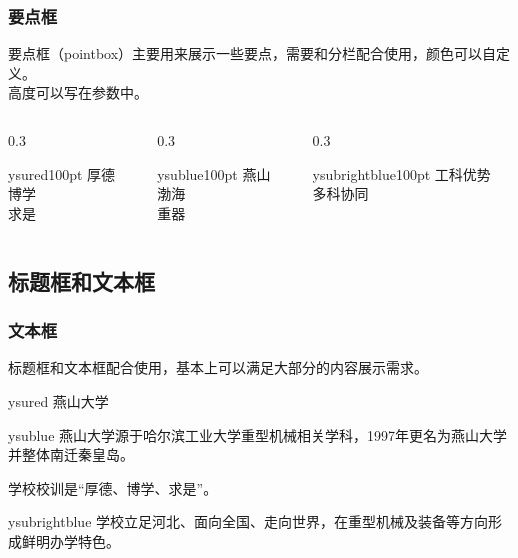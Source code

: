 \documentclass[aspectratio=169,UTF8,t]{beamer}%
\begin{document}
\begin{frame}
    \frametitle{要点框}
    要点框（pointbox）主要用来展示一些要点，需要和分栏配合使用，颜色可以自定义。 \\   
    高度可以写在参数中。  
      \begin{columns}[T,onlytextwidth]
        \begin{column}{0.3\textwidth}
            \begin{pointbox}[要点一]{ysured}{100pt}
                厚德\\
                博学\\
                求是\\
            \end{pointbox}
        \end{column}
        \begin{column}{0.3\textwidth}
            \begin{pointbox}[要点二]{ysublue}{100pt}
                燕山\\
                渤海\\
                重器 
            \end{pointbox}            
        \end{column}
        \begin{column}{0.3\textwidth}
            \begin{pointbox}[要点三]{ysubrightblue}{100pt}
                工科优势\\
                多科协同 
            \end{pointbox}
        \end{column}
    \end{columns}    
\end{frame}

\subsection{标题框和文本框}

\begin{frame}
    \frametitle{文本框}
    标题框和文本框配合使用，基本上可以满足大部分的内容展示需求。 \\       
    \begin{headbox}{ysured}
        燕山大学
    \end{headbox}  
    \begin{textbox}{ysublue}
        燕山大学源于哈尔滨工业大学重型机械相关学科，1997年更名为燕山大学并整体南迁秦皇岛。

        学校校训是“厚德、博学、求是”。
    \end{textbox}
    \begin{textbox}{ysubrightblue}
        学校立足河北、面向全国、走向世界，在重型机械及装备等方向形成鲜明办学特色。
    \end{textbox}
      
\end{frame}
\end{document}
